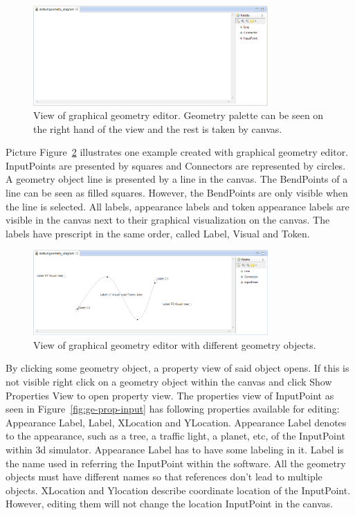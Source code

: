 \begin{figure}[htp]
\begin{center}
  \includegraphics[width=0.8\textwidth]{image/ge-diag-empty.png}
  \caption{View of graphical geometry editor. Geometry palette can be seen on the right hand of the view and the rest is taken by canvas.}
  \label{fig:ge-diag-empty}
\end{center}
\end{figure}

Picture Figure~\ref{fig:ge-diag-exam} illustrates one example created with graphical geometry editor. InputPoints are presented by squares and Connectors are represented by circles. A geometry object line is presented by a line in the canvas. The BendPoints of a line can be seen as filled squares. However, the BendPoints are only visible when the line is selected. All labels, appearance labels and token appearance labels are visible in the canvas next to their graphical visualization on the canvas. The labels have prescript in the same order, called Label, Visual and Token. 

\begin{figure}[htp]
\begin{center}
  \includegraphics[width=0.8\textwidth]{image/ge-diag-exam.png}
  \caption{View of graphical geometry editor with different geometry objects.}
  \label{fig:ge-diag-exam}
\end{center}
\end{figure}

By clicking some geometry object, a property view of said object opens. If this is not visible right click on a geometry object within the canvas and click Show Properties View to open property view.
The properties view of InputPoint as seen in Figure~\ref{fig:ge-prop-input} has following properties available for editing: Appearance Label, Label, XLocation and YLocation. Appearance Label denotes to the appearance, such as a tree, a traffic light, a planet, etc, of the InputPoint within 3d simulator. Appearance Label has to have some labeling in it. Label is the name used in referring the InputPoint within the software. All the geometry objects must have different names so that references don't lead to multiple objects. XLocation and Ylocation describe coordinate location of the InputPoint. However, editing them will not change the location InputPoint in the canvas.

